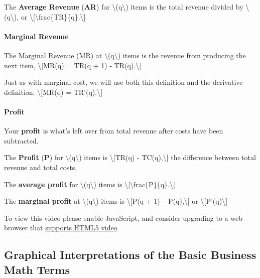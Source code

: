 The \textbf{Average Revenue} (\textbf{AR}) for
\textbackslash{}(q\textbackslash{}) items is the total revenue divided
by \textbackslash{}(q\textbackslash{}), or
\textbackslash{}{[}\textbackslash{}frac\{TR\}\{q\}.\textbackslash{}{]}

\hypertarget{marginal-revenue}{%
\paragraph{Marginal Revenue}\label{marginal-revenue}}

The Marginal Revenue (MR) at \textbackslash{}(q\textbackslash{}) items
is the revenue from producing the next item, \textbackslash{}{[}MR(q) =
TR(q + 1) - TR(q).\textbackslash{}{]}

Just as with marginal cost, we will use both this definition and the
derivative definition: \textbackslash{}{[}MR(q) =
TR'(q).\textbackslash{}{]}

\hypertarget{profit}{%
\paragraph{Profit}\label{profit}}

Your \textbf{profit} is what's left over from total revenue after costs
have been subtracted.

The \textbf{Profit} (\textbf{P}) for \textbackslash{}(q\textbackslash{})
items is \textbackslash{}{[}TR(q) - TC(q),\textbackslash{}{]} the
difference between total revenue and total costs.

The \textbf{average profit} for \textbackslash{}(q\textbackslash{})
items is
\textbackslash{}{[}\textbackslash{}frac\{P\}\{q\}.\textbackslash{}{]}

The \textbf{marginal profit} at \textbackslash{}(q\textbackslash{})
items is \textbackslash{}{[}P(q + 1) -- P(q),\textbackslash{}{]} or
\textbackslash{}{[}P'(q)\textbackslash{}{]}

To view this video please enable JavaScript, and consider upgrading to a
web browser that \href{http://videojs.com/html5-video-support/}{supports
HTML5 video}

\hypertarget{graphical-interpretations-of-the-basic-business-math-terms}{%
\subsection{Graphical Interpretations of the Basic Business Math
Terms}\label{graphical-interpretations-of-the-basic-business-math-terms}}

